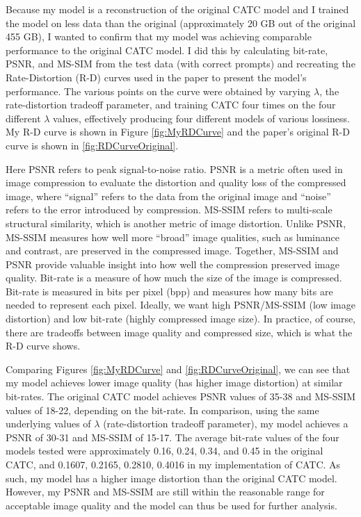 Because my model is a reconstruction of the original CATC model and I trained the model on less data than the original (approximately 20 GB out of the original 455 GB), I wanted to confirm that my model was achieving comparable performance to the original CATC model. I did this by calculating bit-rate, PSNR, and MS-SIM from the test data (with correct prompts) and recreating the Rate-Distortion (R-D) curves used in the paper to present the model's performance. The various points on the curve were obtained by varying $\lambda$, the rate-distortion tradeoff parameter, and training CATC four times on the four different $\lambda$ values, effectively producing four different models of various lossiness. My R-D curve is shown in Figure \ref{fig:MyRDCurve} and the paper's original R-D curve is shown in \ref{fig:RDCurveOriginal}. \par
Here PSNR refers to peak signal-to-noise ratio. PSNR is a metric often used in image compression to evaluate the distortion and quality loss of the compressed image, where ``signal'' refers to the data from the original image and ``noise'' refers to the error introduced by compression. MS-SSIM refers to multi-scale structural similarity, which is another metric of image distortion. Unlike PSNR, MS-SSIM measures how well more ``broad'' image qualities, such as luminance and contrast, are preserved in the compressed image. Together, MS-SSIM and PSNR provide valuable insight into how well the compression preserved image quality. Bit-rate is a measure of how much the size of the image is compressed. Bit-rate is measured in bits per pixel (bpp) and measures how many bits are needed to represent each pixel. Ideally, we want high PSNR/MS-SSIM (low image distortion) and low bit-rate (highly compressed image size). In practice, of course, there are tradeoffs between image quality and compressed size, which is what the R-D curve shows. \par

Comparing Figures \ref{fig:MyRDCurve} and \ref{fig:RDCurveOriginal}, we can see that my model achieves lower image quality (has higher image distortion) at similar bit-rates. The original CATC model achieves PSNR values of 35-38 and MS-SSIM values of 18-22, depending on the bit-rate. In comparison, using the same underlying values of $\lambda$ (rate-distortion tradeoff parameter), my model achieves a PSNR of 30-31 and MS-SSIM of 15-17. The average bit-rate values of the four models tested were approximately 0.16, 0.24, 0.34, and 0.45 in the original CATC, and 0.1607, 0.2165, 0.2810, 0.4016 in my implementation of CATC. As such, my model has a higher image distortion than the original CATC model. However, my PSNR and MS-SSIM are still within the reasonable range for acceptable image quality and the model can thus be used for further analysis.

